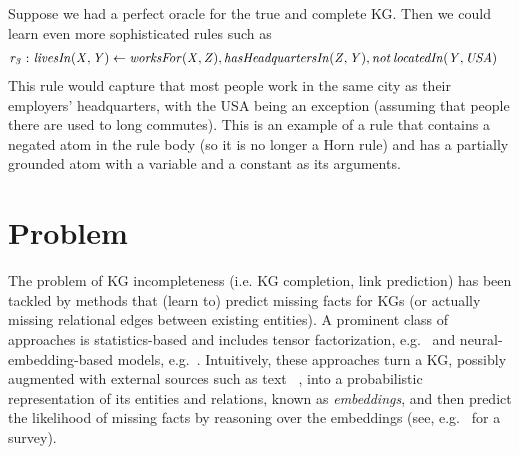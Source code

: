 Suppose we had a perfect oracle for the true and complete KG. Then
we could learn even more sophisticated rules such as
 {\small
 \begin{align}
\mi{r_3 :\ } &\mi{livesIn(X,Y) \leftarrow worksFor(X,Z), hasHeadquartersIn(Z,Y), \mi{not}\, locatedIn(Y,USA)}%
	\label{eq:ex-rule-3}
\end{align}}
This rule would capture that most people work in the same city
as their employers' headquarters, with the USA being an exception
(assuming that people there are used to long commutes).
This is an example of a rule that contains a negated atom in
the rule body (so it is no longer a Horn rule) and has a partially
grounded atom with a variable and a constant as its arguments.


%
\section{Problem}
The problem of  KG incompleteness (i.e. KG completion, link prediction) has been tackled by methods that
(learn to) predict missing facts for KGs 
(or actually missing relational edges between
existing entities). A prominent class of approaches is statistics-based and includes
tensor factorization, e.g.~\cite{conf/icml/NickelTK11} and neural-embedding-based models, e.g.~\cite{Bordes:NIPS2013,DBLP:conf/aaai/NickelRP16}.
Intuitively, these approaches turn a KG, possibly augmented with
external sources such as 
text%
~\cite{DBLP:conf/ijcai/WangL16,DBLP:conf/aaai/0005HMZ17}, 
into a probabilistic representation
of its entities and relations,
known as \emph{embeddings}, 
and then predict the likelihood of %
missing facts by reasoning over the embeddings
(see, e.g.~\cite{DBLP:journals/tkde/WangMWG17} for a survey). 

%

%

